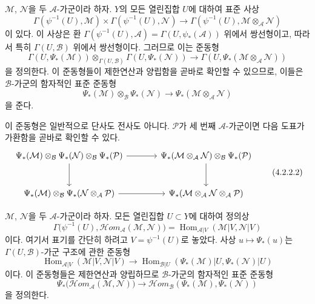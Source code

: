 \begin{env}[4.2.2]
\label{0.4.2.2-ko}
$\mathcal M$, $\mathcal N$을 두 $\mathcal A$-가군이라 하자.
$Y$의 모든 열린집합 $U$에 대하여 표준 사상
\[
  \Gamma(\psi^{-1}(U),\mathcal M)
  \times\Gamma(\psi^{-1}(U),\mathcal N)
  \longrightarrow
  \Gamma(\psi^{-1}(U),\mathcal M\otimes_{\mathcal A}\mathcal N)
\]
이 있다. 이 사상은 환
$\Gamma(\psi^{-1}(U),\mathcal A)=\Gamma(U,\psi_*(\mathcal A))$
위에서 쌍선형이고, 따라서 특히 $\Gamma(U,\mathcal B)$ 위에서
쌍선형이다. 그러므로 이는 준동형
\[
  \Gamma(U,\Psi_*(\mathcal M))
  \otimes_{\Gamma(U,\mathcal B)}
  \Gamma(U,\Psi_*(\mathcal N))
  \longrightarrow
  \Gamma(U,\Psi_*(\mathcal M\otimes_{\mathcal A}\mathcal N))
\]
을 정의한다. 이 준동형들이 제한연산과 양립함을 곧바로 확인할 수
있으므로, 이들은 $\mathcal B$-가군의 함자적인 표준 준동형
\[
  \Psi_*(\mathcal M)\otimes_{\mathcal B}\Psi_*(\mathcal N)
  \longrightarrow
  \Psi_*(\mathcal M\otimes_{\mathcal A}\mathcal N)
  \tag{4.2.2.1}\label{0.4.2.2.1-ko}
\]
을 준다.

이 준동형은 일반적으로 단사도 전사도 아니다. $\mathcal P$가 세 번째
$\mathcal A$-가군이면 다음 도표가 가환함을 곧바로 확인할 수 있다.
\[
\begin{tikzcd}[column sep=large,row sep=large]
\Psi_*(\mathcal M)\otimes_{\mathcal B}\Psi_*(\mathcal N)
  \otimes_{\mathcal B}\Psi_*(\mathcal P)
  \arrow[r]
  \arrow[d]
&
\Psi_*(\mathcal M\otimes_{\mathcal A}\mathcal N)
  \otimes_{\mathcal B}\Psi_*(\mathcal P)
  \arrow[d]
\\
\Psi_*(\mathcal M)\otimes_{\mathcal B}
  \Psi_*(\mathcal N\otimes_{\mathcal A}\mathcal P)
  \arrow[r]
&
\Psi_*(\mathcal M\otimes_{\mathcal A}\mathcal N
  \otimes_{\mathcal A}\mathcal P)
\end{tikzcd}
\tag{4.2.2.2}\label{0.4.2.2.2-ko}
\]
\end{env}

\begin{env}[4.2.3]
\label{0.4.2.3-ko}
$\mathcal M$, $\mathcal N$을 두 $\mathcal A$-가군이라 하자.
모든 열린집합 $U\subset Y$에 대하여 정의상
\[
  \Gamma\bigl(\psi^{-1}(U),
    \mathcal H\!om_{\mathcal A}(\mathcal M,\mathcal N)\bigr)
  =
  \operatorname{Hom}_{\mathcal A|V}
    (\mathcal M|V,\mathcal N|V)
\]
이다. 여기서 표기를 간단히 하려고 $V=\psi^{-1}(U)$로 놓았다.
사상 $u\mapsto\Psi_*(u)$는 $\Gamma(U,\mathcal B)$-가군 구조에 관한
준동형
\[
  \operatorname{Hom}_{\mathcal A|V}(\mathcal M|V,\mathcal N|V)
  \longrightarrow
  \operatorname{Hom}_{\mathcal B|U}
    (\Psi_*(\mathcal M)|U,\Psi_*(\mathcal N)|U)
\]
이다. 이 준동형들은 제한연산과 양립하므로 $\mathcal B$-가군의
함자적인 표준 준동형
\[
  \Psi_*\bigl(\mathcal H\!om_{\mathcal A}(\mathcal M,\mathcal N)\bigr)
  \longrightarrow
  \mathcal H\!om_{\mathcal B}
    (\Psi_*(\mathcal M),\Psi_*(\mathcal N))
  \tag{4.2.3.1}\label{0.4.2.3.1-ko}
\]
을 정의한다.
\end{env}

